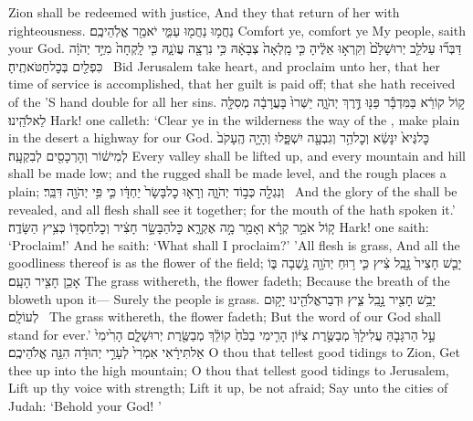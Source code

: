 {Zion shall be redeemed with justice, And they that return of her with righteousness.}
\label{haft_45}
\setcounter{chap}{40}
\setcounter{verse}{1}
{נַחֲמ֥וּ נַחֲמ֖וּ עַמִּ֑י יֹאמַ֖ר אֱלֹֽהֵיכֶֽם׃}
{Comfort ye, comfort ye My people, saith your God.}
{דַּבְּר֞וּ עַל\maqqaf לֵ֤ב יְרוּשָׁלַ֙͏ִם֙ וְקִרְא֣וּ אֵלֶ֔יהָ כִּ֤י מָֽלְאָה֙ צְבָאָ֔הּ כִּ֥י נִרְצָ֖ה עֲוֺנָ֑הּ כִּ֤י לָֽקְחָה֙ מִיַּ֣ד יְהֹוָ֔ה כִּפְלַ֖יִם בְּכׇל\maqqaf חַטֹּאתֶֽיהָ׃ \setuma }
{Bid Jerusalem take heart, and proclaim unto her, that her time of service is accomplished, that her guilt is paid off; that she hath received of the \lord’S hand double for all her sins.}
{ק֣וֹל קוֹרֵ֔א בַּמִּדְבָּ֕ר פַּנּ֖וּ דֶּ֣רֶךְ יְהֹוָ֑ה יַשְּׁרוּ֙ בָּעֲרָבָ֔ה מְסִלָּ֖ה לֵאלֹהֵֽינוּ׃}
{Hark! one calleth: ‘Clear ye in the wilderness the way of the \lord, make plain in the desert a highway for our God.}
{כׇּל\maqqaf גֶּיא֙ יִנָּשֵׂ֔א וְכׇל\maqqaf הַ֥ר וְגִבְעָ֖ה יִשְׁפָּ֑לוּ וְהָיָ֤ה הֶֽעָקֹב֙ לְמִישׁ֔וֹר וְהָרְכָסִ֖ים לְבִקְעָֽה׃}
{Every valley shall be lifted up, and every mountain and hill shall be made low; and the rugged shall be made level, and the rough places a plain;}
{וְנִגְלָ֖ה כְּב֣וֹד יְהֹוָ֑ה וְרָא֤וּ כׇל\maqqaf בָּשָׂר֙ יַחְדָּ֔ו כִּ֛י פִּ֥י יְהֹוָ֖ה דִּבֵּֽר׃ \petucha }
{And the glory of the \lord\space shall be revealed, and all flesh shall see it together; for the mouth of the \lord\space hath spoken it.’}
{ק֚וֹל אֹמֵ֣ר קְרָ֔א וְאָמַ֖ר מָ֣ה אֶקְרָ֑א כׇּל\maqqaf הַבָּשָׂ֣ר חָצִ֔יר וְכׇל\maqqaf חַסְדּ֖וֹ כְּצִ֥יץ הַשָּׂדֶֽה׃}
{Hark! one saith: ‘Proclaim!’ And he saith: ‘What shall I proclaim?’ ’All flesh is grass, And all the goodliness thereof is as the flower of the field;}
{יָבֵ֤שׁ חָצִיר֙ נָ֣בֵֽל צִ֔יץ כִּ֛י ר֥וּחַ יְהֹוָ֖ה נָ֣שְׁבָה בּ֑וֹ אָכֵ֥ן חָצִ֖יר הָעָֽם׃}
{The grass withereth, the flower fadeth; Because the breath of the \lord\space bloweth upon it— Surely the people is grass.}
{יָבֵ֥שׁ חָצִ֖יר נָ֣בֵֽל צִ֑יץ וּדְבַר\maqqaf אֱלֹהֵ֖ינוּ יָק֥וּם לְעוֹלָֽם׃ \setuma }
{The grass withereth, the flower fadeth; But the word of our God shall stand for ever.’}
{עַ֣ל הַר\maqqaf גָּבֹ֤הַּ עֲלִי\maqqaf לָךְ֙ מְבַשֶּׂ֣רֶת צִיּ֔וֹן הָרִ֤ימִי בַכֹּ֙חַ֙ קוֹלֵ֔ךְ מְבַשֶּׂ֖רֶת יְרוּשָׁלָ֑͏ִם הָרִ֙ימִי֙ אַל\maqqaf תִּירָ֔אִי אִמְרִי֙ לְעָרֵ֣י יְהוּדָ֔ה הִנֵּ֖ה אֱלֹהֵיכֶֽם׃}
{O thou that tellest good tidings to Zion, Get thee up into the high mountain; O thou that tellest good tidings to Jerusalem, Lift up thy voice with strength; Lift it up, be not afraid; Say unto the cities of Judah: ‘Behold your God! ’}
